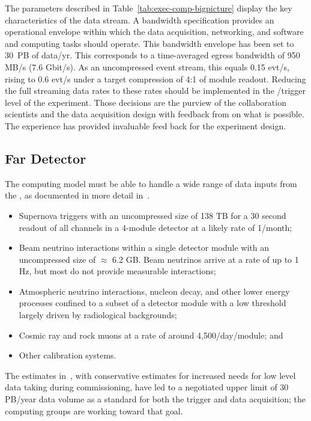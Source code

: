 The parameters described in Table~\ref{tab:exec-comp-bigpicture} display the key characteristics of the   data stream.  A bandwidth specification provides an operational envelope within which the data acquisition, networking, and software and computing tasks should  operate. This bandwidth envelope has been set to  30~PB of data/yr.  This corresponds to a time-averaged egress bandwidth  of 950 MB/s (7.6 Gbit/s).  As an uncompressed event stream, this equals 0.15 evt/s, rising to 0.6 evt/s under a target compression of 4:1 of  module readout. Reducing the full streaming data rates to these rates should be implemented in the /trigger level of the experiment. 
Those decisions are the purview of the collaboration scientists and the data acquisition design with feedback from  on what is possible.  The  experience has provided invaluable feed back for the experiment design. 

\subsection{Far Detector}

The computing model must be able to handle a wide range of data inputs from the , as documented in more detail in~\cite{bib:docdb9240}.

\begin{itemize}
\item Supernova triggers with an uncompressed size of 138 TB for a 30 second readout of all channels in a 4-module  detector at a likely rate of 1/month;  
\item Beam neutrino interactions within a single detector module with an uncompressed size of $\approx$ 6.2 GB.  Beam neutrinos arrive at a rate of up to 1 Hz, but most do not provide measurable interactions;
\item Atmospheric neutrino interactions, nucleon decay, and other lower energy processes confined to a subset of a detector module with a low threshold largely driven by radiological backgrounds;
\item Cosmic ray and rock muons at a rate of around 4,500/day/module; and
\item Other calibration systems.
\end{itemize}

The estimates in~\cite{bib:docdb9240}, with conservative estimates for increased needs for low level data taking during commissioning, have led to a negotiated upper limit of 30 PB/year data volume as a standard for both the trigger and data acquisition; the computing groups are working toward that goal. 




